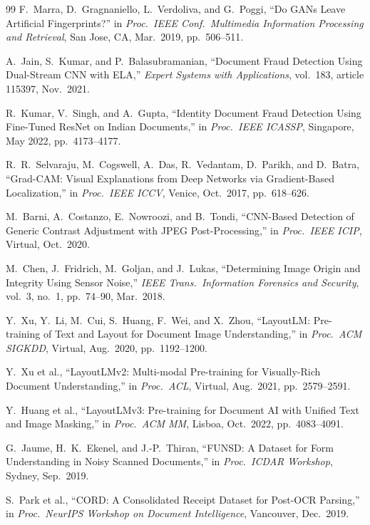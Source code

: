 \documentclass[12pt,a4paper,oneside]{report}
\begin{document}
\begin{thebibliography}{99}
F.~Marra, D.~Gragnaniello, L.~Verdoliva, and G.~Poggi,
``Do GANs Leave Artificial Fingerprints?''
in \textit{Proc.\ IEEE Conf.\ Multimedia Information Processing and Retrieval},
San Jose, CA, Mar.\ 2019, pp.~506--511.
 
A.~Jain, S.~Kumar, and P.~Balasubramanian,
``Document Fraud Detection Using Dual-Stream CNN with ELA,''
\textit{Expert Systems with Applications}, vol.~183, article 115397, Nov.\ 2021.
 
R.~Kumar, V.~Singh, and A.~Gupta,
``Identity Document Fraud Detection Using Fine-Tuned ResNet on Indian Documents,''
in \textit{Proc.\ IEEE ICASSP}, Singapore, May 2022, pp.~4173--4177.
 
R.~R.~Selvaraju, M.~Cogswell, A.~Das, R.~Vedantam, D.~Parikh, and D.~Batra,
``Grad-CAM: Visual Explanations from Deep Networks via Gradient-Based Localization,''
in \textit{Proc.\ IEEE ICCV}, Venice, Oct.\ 2017, pp.~618--626.
 
M.~Barni, A.~Costanzo, E.~Nowroozi, and B.~Tondi,
``CNN-Based Detection of Generic Contrast Adjustment with JPEG Post-Processing,''
in \textit{Proc.\ IEEE ICIP}, Virtual, Oct.\ 2020.
 
M.~Chen, J.~Fridrich, M.~Goljan, and J.~Lukas,
``Determining Image Origin and Integrity Using Sensor Noise,''
\textit{IEEE Trans.\ Information Forensics and Security},
vol.~3, no.~1, pp.~74--90, Mar.\ 2018.
 
Y.~Xu, Y.~Li, M.~Cui, S.~Huang, F.~Wei, and X.~Zhou,
``LayoutLM: Pre-training of Text and Layout for Document Image Understanding,''
in \textit{Proc.\ ACM SIGKDD}, Virtual, Aug.\ 2020, pp.~1192--1200.
 
Y.~Xu et al.,
``LayoutLMv2: Multi-modal Pre-training for Visually-Rich Document Understanding,''
in \textit{Proc.\ ACL}, Virtual, Aug.\ 2021, pp.~2579--2591.
 
Y.~Huang et al.,
``LayoutLMv3: Pre-training for Document AI with Unified Text and Image Masking,''
in \textit{Proc.\ ACM MM}, Lisboa, Oct.\ 2022, pp.~4083--4091.
 
G.~Jaume, H.~K.~Ekenel, and J.-P.~Thiran,
``FUNSD: A Dataset for Form Understanding in Noisy Scanned Documents,''
in \textit{Proc.\ ICDAR Workshop}, Sydney, Sep.\ 2019.
 
S.~Park et al.,
``CORD: A Consolidated Receipt Dataset for Post-OCR Parsing,''
in \textit{Proc.\ NeurIPS Workshop on Document Intelligence},
Vancouver, Dec.\ 2019.
 

\end{thebibliography}
\end{document}
